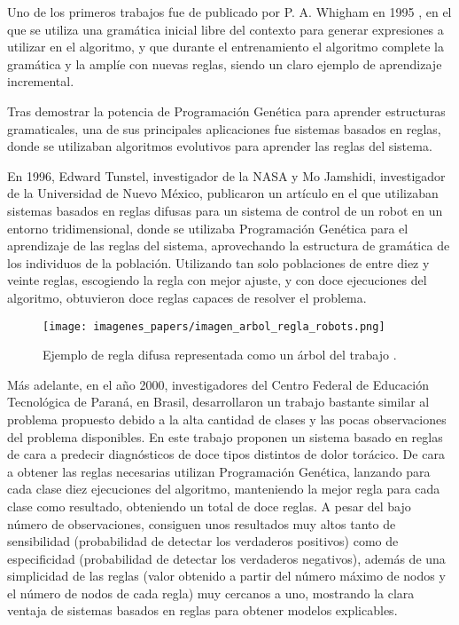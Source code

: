 Uno de los primeros trabajos fue de publicado por P. A. Whigham en 1995 \cite{PGgramaticas}, en el que se utiliza una gramática inicial libre del contexto para generar expresiones a utilizar en el algoritmo, y que durante el entrenamiento el algoritmo complete la gramática y la amplíe con nuevas reglas, siendo un claro ejemplo de aprendizaje incremental.

Tras demostrar la potencia de Programación Genética para aprender estructuras gramaticales, una de sus principales aplicaciones fue sistemas basados en reglas, donde se utilizaban algoritmos evolutivos para aprender las reglas del sistema.

En 1996, Edward Tunstel, investigador de la NASA y Mo Jamshidi, investigador de la Universidad de Nuevo México, publicaron un artículo \cite{PGcontrolRobots} en el que utilizaban sistemas basados en reglas difusas para un sistema de control de un robot en un entorno tridimensional, donde se utilizaba Programación Genética para el aprendizaje de las reglas del sistema, aprovechando la estructura de gramática de los individuos de la población. Utilizando tan solo poblaciones de entre diez y veinte reglas, escogiendo la regla con mejor ajuste, y con doce ejecuciones del algoritmo, obtuvieron doce reglas capaces de resolver el problema.

\begin{figure}[H]
	\centering
	\texttt{[image: imagenes\_papers/imagen\_arbol\_regla\_robots.png]}
	\caption{Ejemplo de regla difusa representada como un árbol del trabajo \cite{PGcontrolRobots}.}
	\label{fig:imagen_arbol_regla_robots}
\end{figure}

Más adelante, en el año 2000, investigadores del Centro Federal de Educación Tecnológica de Paraná, en Brasil, desarrollaron un trabajo \cite{trabajoChestPain} bastante similar al problema propuesto debido a la alta cantidad de clases y las pocas observaciones del problema disponibles. En este trabajo proponen un sistema basado en reglas de cara a predecir diagnósticos de doce tipos distintos de dolor torácico. De cara a obtener las reglas necesarias utilizan Programación Genética, lanzando para cada clase diez ejecuciones del algoritmo, manteniendo la mejor regla para cada clase como resultado, obteniendo un total de doce reglas. A pesar del bajo número de observaciones, consiguen unos resultados muy altos tanto de sensibilidad (probabilidad de detectar los verdaderos positivos) como de especificidad (probabilidad de detectar los verdaderos negativos), además de una simplicidad de las reglas (valor obtenido a partir del número máximo de nodos y el número de nodos de cada regla) muy cercanos a uno, mostrando la clara ventaja de sistemas basados en reglas para obtener modelos explicables.

